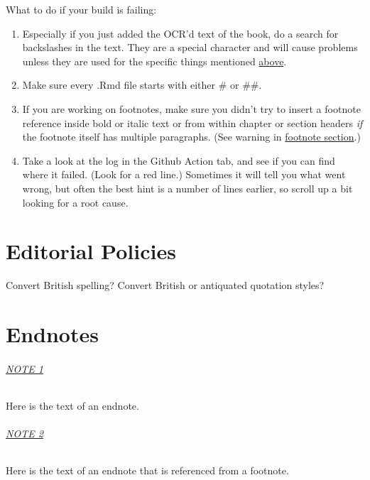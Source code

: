 \documentclass[
  english,
]{book}
\providecommand{\tightlist}{%
  \setlength{\itemsep}{0pt}\setlength{\parskip}{0pt}}
\begin{document}
What to do if your build is failing:

\begin{enumerate}
\def\labelenumi{\arabic{enumi}.}
\tightlist
\item
  Especially if you just added the OCR'd text of the book, do a search for backslashes in the text. They are a special character and will cause problems unless they are used for the specific things mentioned \protect\hyperlink{backslashes}{above}.
\item
  Make sure every .Rmd file starts with either \# or \#\#.
\item
  If you are working on footnotes, make sure you didn't try to insert a footnote reference inside bold or italic text or from within chapter or section headers \emph{if} the footnote itself has multiple paragraphs. (See warning in \protect\hyperlink{footnotes}{footnote section}.)
\item
  Take a look at the log in the Github Action tab, and see if you can find where it failed. (Look for a red line.) Sometimes it will tell you what went wrong, but often the best hint is a number of lines earlier, so scroll up a bit looking for a root cause.
\end{enumerate}

\hypertarget{editorial-policies}{%
\chapter{Editorial Policies}\label{editorial-policies}}

Convert British spelling?
Convert British or antiquated quotation styles?

\hypertarget{endnotes-1}{%
\chapter*{Endnotes}\label{endnotes-1}}

\hypertarget{en.01}{%
\subparagraph*{\texorpdfstring{\protect\hyperlink{en.01.backlink}{NOTE 1}}{NOTE 1}}\label{en.01}}

Here is the text of an endnote.

\hypertarget{en.02}{%
\subparagraph*{\texorpdfstring{\protect\hyperlink{en.02.backlink}{NOTE 2}}{NOTE 2}}\label{en.02}}

Here is the text of an endnote that is referenced from a footnote.
\end{document}
